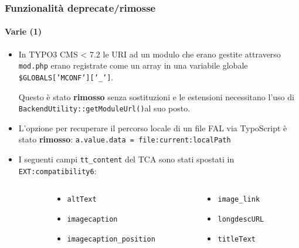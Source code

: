 \begin{frame}[fragile]
	\frametitle{Funzionalità deprecate/rimosse}
	\framesubtitle{Varie (1)}

	\begin{itemize}

		\item In TYPO3 CMS < 7.2 le URI ad un modulo che erano gestite attraverso
			\texttt{mod.php} erano registrate come un array in una variabile globale
			\small\texttt{\$GLOBALS['MCONF']['\_']}\normalsize.

			Questo è stato \textbf{rimosso} senza sostituzioni e le estensioni necessitano l'uso di
			\texttt{BackendUtility::getModuleUrl()}\normalsize\space al suo posto.

		\item L'opzione per recuperare il percorso locale di un file FAL via TypoScript è
			stato \textbf{rimosso}: \texttt{a.value.data = file:current:localPath}

		\item I seguenti campi \texttt{tt\_content} del TCA sono stati spostati in
			\texttt{EXT:compatibility6}:

	\end{itemize}

	\vspace{-0.2cm}

	\begin{columns}[T]
		\begin{column}{.06\textwidth}
		\end{column}
		\begin{column}{.47\textwidth}
			\smaller
			\begin{itemize}
				\item \texttt{altText}
				\item \texttt{imagecaption}
				\item \texttt{imagecaption\_position}
			\end{itemize}
			\normalsize
		\end{column}
		\begin{column}{.47\textwidth}
			\smaller
			\begin{itemize}
				\item \texttt{image\_link}
				\item \texttt{longdescURL}
				\item \texttt{titleText}
			\end{itemize}
			\normalsize
		\end{column}
	\end{columns}

\end{frame}

